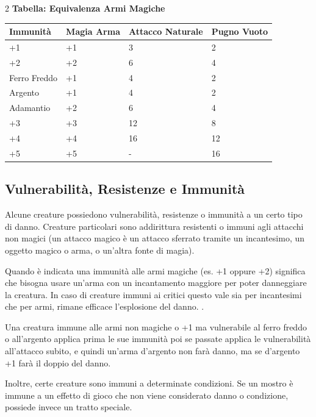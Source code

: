 \begin{multicols}{2}
\textbf{Tabella: Equivalenza Armi Magiche}\label{equivalenzaarmimagiche}\hypertarget{equivalenzaarmimagiche}{}

\medskip

\noindent\begin{tabularx}{\linewidth}{lXXX}
		\toprule
 \rowcolor{gray!20}\textbf{Immunità} & \textbf{Magia Arma} & \textbf{Attacco Naturale}& \textbf{Pugno Vuoto}\\
	\toprule
	+1 & +1 & 3& 2\\
 \rowcolor{gray!20}+2 & +2 & 6& 4\\
	Ferro Freddo & +1 & 4& 2\\
 \rowcolor{gray!20}Argento & +1 & 4& 2\\
	Adamantio & +2 & 6& 4\\
 \rowcolor{gray!20}+3 & +3 & 12& 8\\
	+4 & +4 & 16& 12\\
 \rowcolor{gray!20}+5 & +5 & - & 16
\end{tabularx}

\subsection{Vulnerabilità, Resistenze e Immunità}\label{vulnerabilitaresistenze}
Alcune creature possiedono vulnerabilità, resistenze o immunità a un certo tipo di danno. Creature particolari sono addirittura resistenti o immuni agli attacchi non magici (un attacco magico è un attacco sferrato tramite un incantesimo, un oggetto magico o arma, o un'altra fonte di magia).

Quando è indicata una immunità alle armi magiche (es. +1 oppure +2) significa che bisogna usare un'arma con un incantamento maggiore per poter danneggiare la creatura. In caso di creature immuni ai critici questo vale sia per incantesimi che per armi, rimane efficace l'esplosione del danno. .

Una creatura immune alle armi non magiche o +1 ma vulnerabile al ferro freddo o all'argento applica prima le sue immunità poi se passate applica le vulnerabilità all'attacco subito, e quindi un'arma d'argento non farà danno, ma se d'argento +1 farà il doppio del danno.

Inoltre, certe creature sono immuni a determinate condizioni. Se un mostro è immune a un effetto di gioco che non viene considerato danno o condizione, possiede invece un tratto speciale.


\end{multicols}
